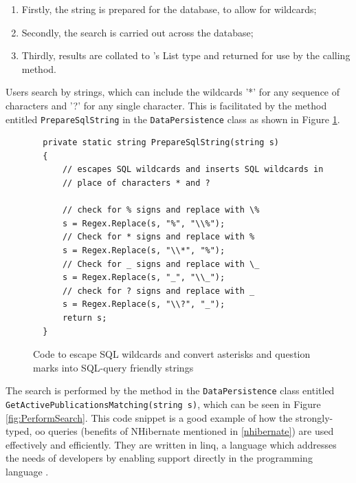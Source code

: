 \begin{enumerate}
	\item Firstly, the string is prepared for the database, to allow for wildcards;
	\item Secondly, the search is carried out across the database;
	\item Thirdly, results are collated to \cs's List type and returned for use by the calling method.
\end{enumerate}

Users search by strings, which can include the wildcards '*' for any sequence of characters and '?' for any single character.
This is facilitated by the method entitled \texttt{PrepareSqlString} in the \texttt{DataPersistence} class as shown in Figure \ref{fig:SQLsearchEscape}.

\begin{figure}
	\begin{center}
			\lstset{language=CSharp} 
			\begin{lstlisting}
  private static string PrepareSqlString(string s)
  {
      // escapes SQL wildcards and inserts SQL wildcards in
      // place of characters * and ?
      
      // check for % signs and replace with \%
      s = Regex.Replace(s, "%", "\\%");
      // Check for * signs and replace with %
      s = Regex.Replace(s, "\\*", "%");
      // Check for _ signs and replace with \_
      s = Regex.Replace(s, "_", "\\_");
      // check for ? signs and replace with _
      s = Regex.Replace(s, "\\?", "_");
      return s;
  }
  		\end{lstlisting}
		\caption{Code to escape SQL wildcards and convert asterisks and question marks into SQL-query friendly strings}
		\label{fig:SQLsearchEscape}
	\end{center}
\end{figure}

The search is performed by the method in the \texttt{DataPersistence} class entitled \texttt{GetActivePublicationsMatching(string s)}, which can be seen in Figure \ref{fig:PerformSearch}.  This code snippet is a good example of how the strongly-typed, \gls{oo} queries (benefits of NHibernate mentioned in \ref{nhibernate}) are used effectively and efficiently.  They are written in \gls{linq}, a language which addresses the needs of developers by enabling support directly in the programming language \cite{csUnleashed}.

